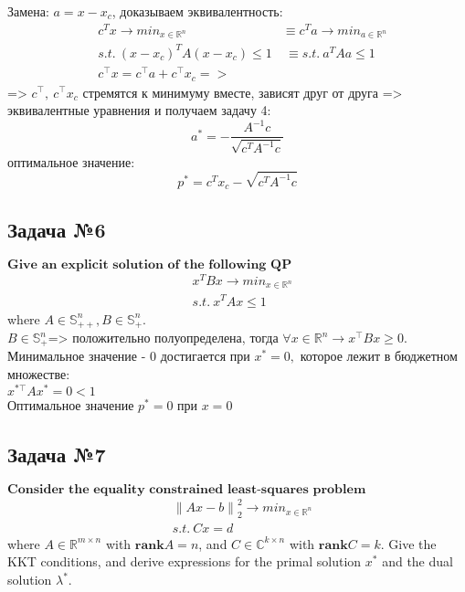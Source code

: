 \documentclass[12pt,letterpaper]{article}
\begin{document}
Замена: $a=x-x_c$, доказываем эквивалентность:
$$\begin{aligned}
&c^Tx\rightarrow min_{x\in \mathbb{R}^n} &\equiv c^Ta\rightarrow min_{a\in \mathbb{R}^n}\\ 
&s.t.\ (x-x_{c})^TA(x-x_c)\leq1 &\ \equiv s.t.\ a^TAa\leq1\\
&c^{\top} x=c^{\top}a+c^{\top} x_{c} =>
\end{aligned} $$
=> $c^{\top},\ c^{\top} x_{c}$ стремятся к минимуму вместе, зависят друг от друга => эквивалентные уравнения и получаем задачу 4:
$$a^* = -\frac{A^{-1} c}{\sqrt{c^{T} A^{-1} c}}$$ 
оптимальное значение:
$$p^{*}=c^{T} x_{c}-\sqrt{c^{T} A^{-1} c}$$

\subsection*{Задача №6}
$\textbf{Give an explicit solution of the following QP}$
$$\begin{aligned}
&x^TBx\rightarrow min_{x\in \mathbb{R}^n}\\ 
&s.t.\ x^TAx\leq1
\end{aligned} $$
where \(A \in \mathbb{S}^n_{++}, B \in \mathbb{S}^n_{+}\).\\

$ B \in \mathbb{S}_{+}^{n}  $=> положительно полуопределена, тогда $\forall x \in \mathbb{R}^{n} \rightarrow x^{\top}Bx \geq 0$. Минимальное значение - 0 достигается при $ x^* = 0, $ которое лежит в бюджетном множестве: \\$ x^{*\top} A x^* = 0 < 1 $\\

Оптимальное значение $ p^* = 0 $ при $ x = 0 $

\subsection*{Задача №7}
$\textbf{Consider the equality constrained least-squares problem}$
$$\begin{aligned}
&{\parallel Ax-b\parallel}^2_2 \rightarrow min_{x\in \mathbb{R}^n}\\ 
&s.t.\ Cx=d
\end{aligned} $$
where \(A \in \mathbb{R}^{m \times n}\) with \(\mathbf{rank }A = n\), and \(C \in \mathbb{C}^{k \times n}\) with \(\mathbf{rank }C = k\). Give the KKT conditions, and derive expressions for the primal solution \(x^*\) and the dual solution \(\lambda^*\).\\
\end{document}
